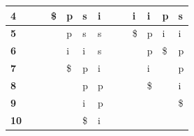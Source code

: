 \begin{table}[!htb]
\begin{tabular}{|l|l|l|l|l|l|l|l|l|l|l|l|l|}
\textbf{4}                                                       &                         &                         & \$                      & p                      & s                      & i                      &                        &                        & i                      & i                      & p                       & s                       \\ \hline
\textbf{5}                                                       &                         &                         &                        & p                      & s                      & s                      &                        &                        & \$                      & p                      & i                       & i                       \\ \hline
\textbf{6}                                                       &                         &                         &                        & i                      & i                      & s                      &                        &                        &                        & p                      & \$                       & p                       \\ \hline
\textbf{7}                                                       &                         &                         &                        & \$                      & p                      & i                      &                        &                        &                        & i                      &                         & p                       \\ \hline
\textbf{8}                                                       &                         &                         &                        &                        & p                      & p                      &                        &                        &                        & \$                      &                         & i                       \\ \hline
\textbf{9}                                                       &                         &                         &                        &                        & i                      & p                      &                        &                        &                        &                        &                         & \$                       \\ \hline
\textbf{10}                                                      &                         &                         &                        &                        & \$                      & i                      &                        &                        &                        &                        &                         &                         \\ \hline

\end{tabular}
\end{table}
